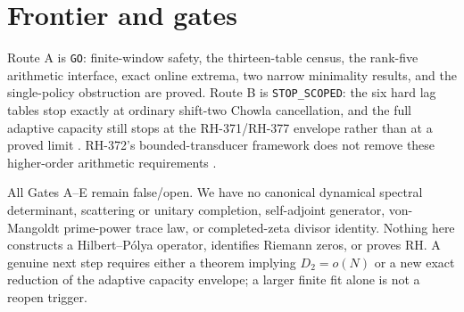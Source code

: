 \documentclass[11pt]{article}
\theoremstyle{definition}
\theoremstyle{remark}
\begin{document}
\section{Frontier and gates}

Route A is \texttt{GO}: finite-window safety, the thirteen-table census,
the rank-five arithmetic interface, exact online extrema, two narrow
minimality results, and the single-policy obstruction are proved.  Route B
is \texttt{STOP\_SCOPED}: the six hard lag tables stop exactly at ordinary
shift-two Chowla cancellation, and the full adaptive capacity still stops at
the RH-371/RH-377 envelope rather than at a proved limit
\cite{RH371,RH377}.  RH-372's bounded-transducer framework does not remove
these higher-order arithmetic requirements \cite{RH372}.

All Gates A--E remain false/open.  We have no canonical dynamical spectral
determinant, scattering or unitary completion, self-adjoint generator,
von-Mangoldt prime-power trace law, or completed-zeta divisor identity.
Nothing here constructs a Hilbert--P\'olya operator, identifies Riemann zeros,
or proves RH.  A genuine next step requires either a theorem implying
$D_2=o(N)$ or a new exact reduction of the adaptive capacity envelope; a
larger finite fit alone is not a reopen trigger.



\end{document}

